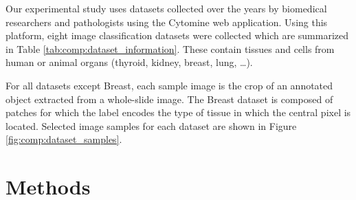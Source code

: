Our experimental study uses datasets collected over the years by biomedical researchers and pathologists using the Cytomine \parencite{maree2016collaborative} web application. Using this platform, eight image classification datasets were collected which are summarized in Table \ref{tab:comp:dataset_information}. These contain tissues and cells from human or animal organs (thyroid, kidney, breast, lung, \ldots).

For all datasets except Breast, each sample image is the crop of an annotated object extracted from a whole-slide image. The Breast dataset is composed of patches for which the label encodes the type of tissue in which the central pixel is located. Selected image samples for each dataset are shown in Figure \ref{fig:comp:dataset_samples}. 




\section{Methods}


\label{sec:comp:methods}






 
